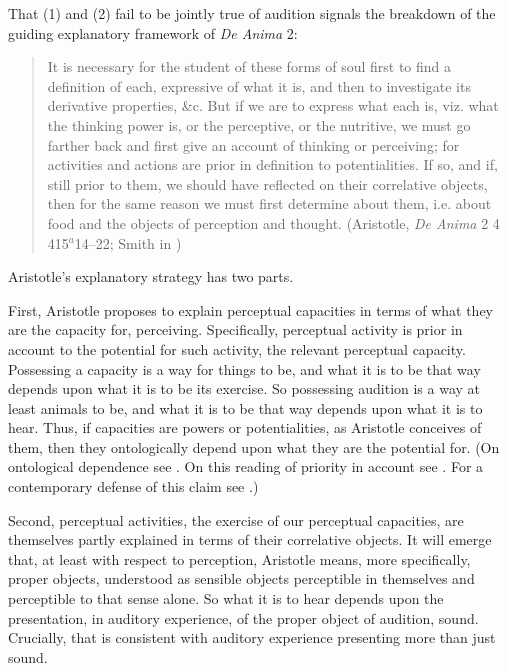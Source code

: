 That (1) and (2) fail to be jointly true of audition signals the breakdown of the guiding explanatory framework of \emph{De Anima} 2:
\begin{quote}
	It is necessary for the student of these forms of soul first to find a definition of each, expressive of what it is, and then to investigate its derivative properties, \&c. But if we are to express what each is, viz. what the thinking power is, or the perceptive, or the nutritive, we must go farther back and first give an account of thinking or perceiving; for activities and actions are prior in definition to potentialities. If so, and if, still prior to them, we should have reflected on their correlative objects, then for the same reason we must first determine about them, i.e. about food and the objects of perception and thought. (Aristotle, \emph{De Anima} 2 4 415\( ^{a} \)14--22; Smith in \citealt[26]{Barnes:1984uq})
\end{quote}
Aristotle's explanatory strategy has two parts. 

First, Aristotle proposes to explain perceptual capacities in terms of what they are the capacity for, perceiving.  Specifically, perceptual activity is prior in account to the potential for such activity, the relevant perceptual capacity. Possessing a capacity is a way for things to be, and what it is to be that way depends upon what it is to be its exercise. So possessing audition is a way at least animals to be, and what it is to be that way depends upon what it is to hear. Thus, if capacities are powers or potentialities, as Aristotle conceives of them, then they ontologically depend upon what they are the potential for. (On ontological dependence see \citealt{Fine:1995ls}. On this reading of priority in account see \citealt{Peramatzis:2011aa}. For a contemporary defense of this claim see \citealt{Kalderon:2012fk}.) 

Second, perceptual activities, the exercise of our perceptual capacities, are themselves partly explained in terms of their correlative objects. It will emerge that, at least with respect to perception, Aristotle means, more specifically, proper objects, understood as sensible objects perceptible in themselves and perceptible to that sense alone. So what it is to hear depends upon the presentation, in auditory experience, of the proper object of audition, sound. Crucially, that is consistent with auditory experience presenting more than just sound.

